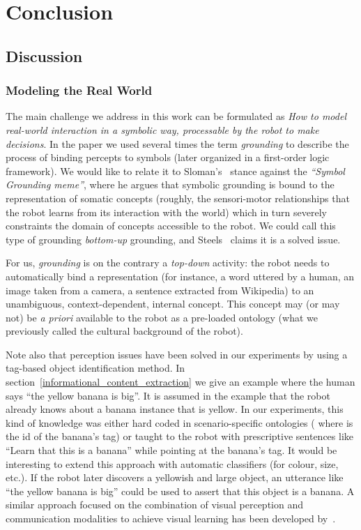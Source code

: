 \chapter{Conclusion}
\label{chapter|conclusion}

\section{Discussion}
\label{sect|discussion}

\subsection{Modeling the Real World}
\label{modeling_real_world}

The main challenge we address in this work can be formulated as \emph{How to
model real-world interaction in a symbolic way, processable by the robot to
make decisions}. In the paper we used several times the term \emph{grounding} to
describe the process of binding percepts to symbols (later organized in a
first-order logic framework).  We would like to relate it to
Sloman's~\cite{Sloman2007} stance against the \emph{``Symbol Grounding meme''},
where he argues that symbolic grounding is bound to the representation of
somatic concepts (\ie roughly, the sensori-motor relationships that the robot
learns from its interaction with the world) which in turn severely constraints
the domain of concepts accessible to the robot. We could call this type of
grounding \emph{bottom-up} grounding, and Steels~\cite{Steels2007} claims it is
a solved issue.

For us, \emph{grounding} is on the contrary a \emph{top-down} activity: the
robot needs to automatically bind a representation (for instance, a word
uttered by a human, an image taken from a camera, a sentence extracted from
Wikipedia) to an unambiguous, context-dependent, internal concept. This 
concept may (or may not) be \textit{a priori} available to the robot as a
pre-loaded ontology (what we previously called the cultural background of the
robot).

Note also that perception issues have been solved in our experiments by using a tag-based object identification
method. In section~\ref{informational_content_extraction} we give an example
where the human says ``the yellow banana is big''. It is assumed in the example
that the robot already knows about a banana instance that is yellow. In our
experiments, this kind of knowledge was either hard coded in scenario-specific
ontologies (\eg {} where 
is the id of the banana's tag) or taught to the robot with prescriptive
sentences like ``Learn that this is a banana'' while pointing at the banana's
tag. It would be interesting to extend this approach with automatic classifiers
(for colour, size, etc.). If the robot later discovers a yellowish and large
object, an utterance like ``the yellow banana is big'' could be used to assert
that this object is a banana.  A similar approach focused on the combination of visual perception and communication modalities to achieve visual learning has been 
developed by~\cite{Vrecko2009}.


